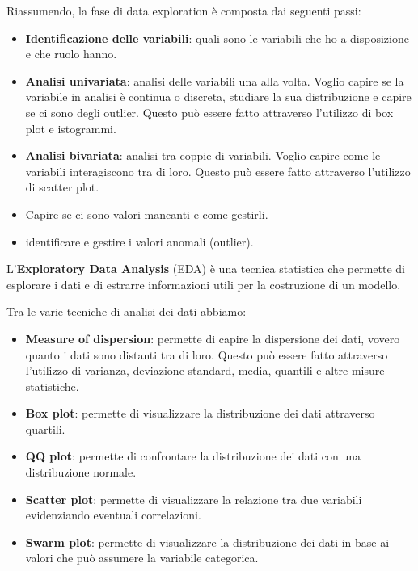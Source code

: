 Riassumendo, la fase di data exploration è composta dai seguenti passi:
\begin{itemize}
      \item \textbf{Identificazione delle variabili}: quali sono le variabili che ho
            a disposizione e che ruolo hanno.
      \item \textbf{Analisi univariata}: analisi delle variabili una alla volta.
            Voglio capire se la variabile in analisi è continua o discreta,
            studiare la sua distribuzione e capire se ci sono degli outlier. Questo
            può essere fatto attraverso l'utilizzo di box plot e istogrammi.
      \item \textbf{Analisi bivariata}: analisi tra coppie di variabili. Voglio
            capire come le variabili interagiscono tra di loro. Questo può essere
            fatto attraverso l'utilizzo di scatter plot.
      \item Capire se ci sono valori mancanti e come gestirli.
      \item identificare e gestire i valori anomali (outlier).
\end{itemize}

\begin{definizione}
      L'\textbf{Exploratory Data Analysis} (EDA) è una tecnica statistica che permette
      di esplorare i dati e di estrarre informazioni utili per la costruzione di un
      modello.
\end{definizione}

Tra le varie tecniche di analisi dei dati abbiamo:
\begin{itemize}
      \item \textbf{Measure of dispersion}: permette di capire la dispersione
            dei dati, vovero quanto i dati sono
            distanti tra di loro. Questo può essere fatto attraverso l'utilizzo
            di varianza, deviazione standard, media, quantili e altre misure statistiche.
      \item \textbf{Box plot}: permette di visualizzare la distribuzione dei dati
            attraverso quartili.
      \item \textbf{QQ plot}: permette di confrontare la distribuzione dei dati
            con una distribuzione normale.
      \item \textbf{Scatter plot}: permette di visualizzare la relazione tra due
            variabili evidenziando eventuali correlazioni.
      \item \textbf{Swarm plot}: permette di visualizzare la distribuzione dei dati
            in base ai valori che può assumere la variabile categorica.
\end{itemize}

